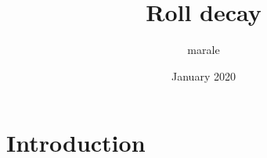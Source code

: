 \documentclass{article}
\title{Roll decay}
\author{marale }
\date{January 2020}
\begin{document}
\maketitle

\section{Introduction}
\end{document}
